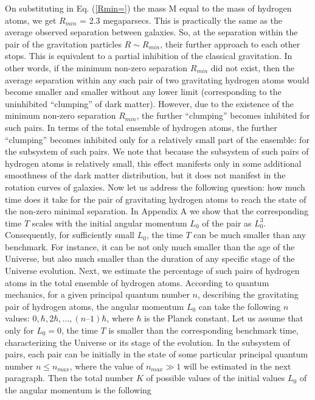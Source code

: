 \documentclass[referee]{raa}            %
\begin{document}
	On substituting in Eq. (\ref{Rmin=}) the mass M equal to the mass of hydrogen atoms, we get $R_{min}$ = 2.3 megaparsecs. This is practically the same as the average observed separation between galaxies.
	So, at the separation within the pair of the gravitation particles $R\sim R_{min}$, their further approach to each other stops. This is equivalent to a partial inhibition of the classical gravitation. 
	In other words, if the minimum non-zero separation $R_{min}$ did not exist, then the average separation within any such pair of two gravitating hydrogen atoms would become smaller and smaller without any lower limit (corresponding to the uninhibited “clumping” of dark matter). However, due to the existence of the minimum non-zero separation $R_{min}$, the further “clumping” becomes inhibited for such pairs. In terms of the total ensemble of hydrogen atoms, the further “clumping” becomes inhibited only for a relatively small part of the ensemble: for the subsystem of such pairs. We note that because the subsystem of such pairs of hydrogen atoms is relatively small, this effect manifests only in some additional smoothness of the dark matter distribution, but it does not manifest in the rotation curves of galaxies.
	Now let us address the following question: how much time does it take for the pair of gravitating hydrogen atoms to reach the state of the non-zero minimal separation. In Appendix A we show that the corresponding time $T$ scales with the initial angular momentum $L_0$ of the pair as $L_0^3$. Consequently, for sufficiently small $L_0$, the time $T$ can be much smaller than any benchmark. For instance, it can be not only much smaller than the age of the Universe, but also much smaller than the duration of any specific stage of the Universe evolution.
	Next, we estimate the percentage of such pairs of hydrogen atoms in the total ensemble of hydrogen atoms. According to quantum mechanics, for a given principal quantum number $n$, describing the gravitating pair of hydrogen atoms, the angular momentum $L_0$ can take the following $n$ values: $0, \hbar, 2\hbar, …, (n – 1)\hbar$, where $\hbar$ is the Planck constant. Let us assume that only for $L_0 = 0$, the time $T$ is smaller than the corresponding benchmark time, characterizing the Universe or its stage of the evolution. In the subsystem of pairs, each pair can be initially in the state of some particular principal quantum number $n \leqslant n_{max}$, where the value of $n_{max} \gg 1 $ will be estimated in the next paragraph. Then the total number $K$ of possible values of the initial values $L_0$ of the angular momentum is the following
\end{document}
